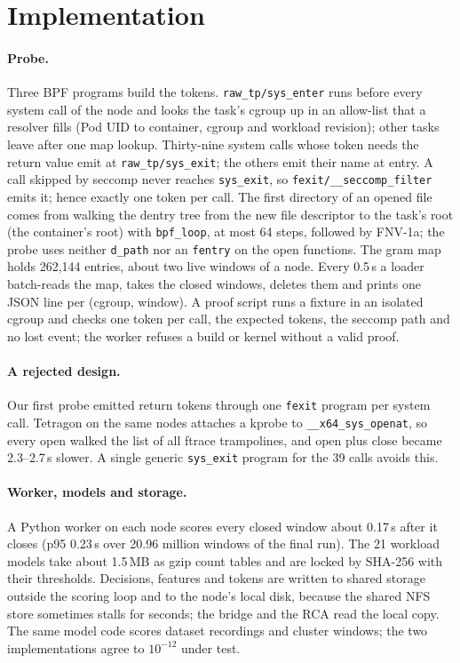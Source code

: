 \section{Implementation}\label{sec:implementation}

\paragraph{Probe.} Three BPF programs build the tokens. \texttt{raw\_tp/sys\_enter} runs before every system call of
the node and looks the task's cgroup up in an allow-list that a resolver fills (Pod UID to container, cgroup and
workload revision); other tasks leave after one map lookup. Thirty-nine system calls whose token needs the return value
emit at \texttt{raw\_tp/sys\_exit}; the others emit their name at entry. A call skipped by seccomp never reaches
\texttt{sys\_exit}, so \texttt{fexit/\_\_seccomp\_filter} emits it; hence exactly one token per call. The first
directory of an opened file comes from walking the dentry tree from the new file descriptor to the task's root (the
container's root) with \texttt{bpf\_loop}, at most 64 steps, followed by FNV-1a; the probe uses neither
\texttt{d\_path} nor an \texttt{fentry} on the open functions. The gram map holds 262{,}144 entries, about two live
windows of a node. Every 0.5\,s a loader batch-reads the map, takes the closed windows, deletes them and prints one
JSON line per (cgroup, window). A proof script runs a fixture in an isolated cgroup and checks one token per call, the
expected tokens, the seccomp path and no lost event; the worker refuses a build or kernel without a valid proof.

\paragraph{A rejected design.} Our first probe emitted return tokens through one \texttt{fexit} program per system
call. Tetragon on the same nodes attaches a kprobe to \texttt{\_\_x64\_sys\_openat}, so every open walked the list of
all ftrace trampolines, and open plus close became 2.3--2.7\,\textmu s slower. A single generic \texttt{sys\_exit}
program for the 39 calls avoids this.

\paragraph{Worker, models and storage.} A Python worker on each node scores every closed window about 0.17\,s after it
closes (p95 0.23\,s over 20.96 million windows of the final run). The 21 workload models take about 1.5\,MB as gzip count tables and are locked by SHA-256 with
their thresholds. Decisions, features and tokens are written to shared storage outside the scoring loop and to the
node's local disk, because the shared NFS store sometimes stalls for seconds; the bridge and the RCA read the local
copy. The same model code scores dataset recordings and cluster windows; the two implementations agree to $10^{-12}$
under test.

